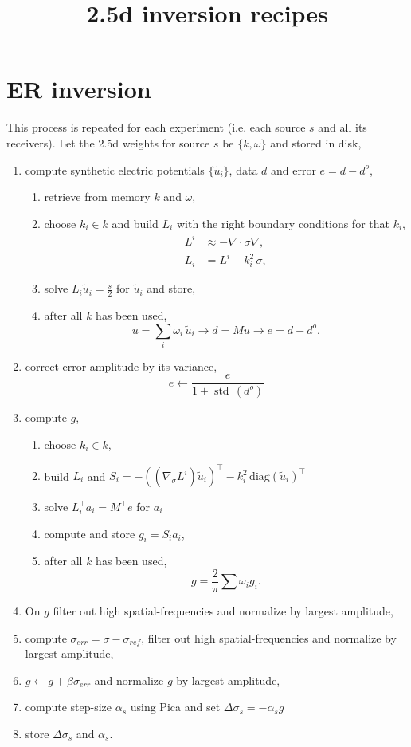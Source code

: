 \documentclass[a4paper,12pt]{article}
\title{2.5d inversion recipes}
\author{}
\date{}
\begin{document}
\maketitle
%
%
% 
\section*{ER inversion}
This process is repeated for each experiment (i.e. each source $s$ and all its receivers). Let the 2.5d weights for source $s$ be $\{k,\omega\}$ and stored in disk,
\begin{enumerate}
\item compute synthetic electric potentials $\{\tilde{u}_i\}$, data $d$ and error $e=d-d^o$,
\begin{enumerate}
\item retrieve from memory $k$ and $\omega$,
\item choose $k_i\in k$ and build $L_i$ with the right boundary conditions for that $k_i$,
\begin{align*}
L^{i} &\approx -\nabla\cdot\sigma\nabla,\\
L_{i} &= L^{i} + k_i^2\,\sigma,
\end{align*}
\item solve $L_{i}\tilde{u}_{i}=\frac{s}{2}$ for $\tilde{u}_{i}$ and store,
\item after all $k$ has been used,
\[ 
u=\sum_i \omega_i \,\tilde{u}_{i} \to d=Mu \to e=d-d^o.
\]
\end{enumerate}
\item correct error amplitude by its variance,
\[
e\gets \frac{e}{1+\operatorname{std}\,(d^o)}
\]
\item compute $g$,
\begin{enumerate}
\item choose $k_i\in k$,
\item build $L_i$ and $S_i=-((\nabla_\sigma L^i)\tilde{u}_i)^\top - k_i^2 \, \mbox{diag}(\tilde{u}_i)^\top$
\item solve $L_i^\top a_i=M^\top e$ for $a_i$
\item compute and store $g_i=S_i a_i$,
\item after all $k$ has been used,
\[ 
g=\frac{2}{\pi}\sum \omega_i g_i.
\]
\end{enumerate}
\item On $g$ filter out high spatial-frequencies and normalize by largest amplitude,
\item compute $\sigma_{err}=\sigma-\sigma_{ref}$, filter out high spatial-frequencies and normalize by largest amplitude,
\item $g\gets g+\beta\sigma_{err}$ and normalize $g$ by largest amplitude,
\item compute step-size $\alpha_s$ using Pica and set $\Delta\sigma_s=-\alpha_s g$
\item store $\Delta\sigma_s$ and $\alpha_s$.
\end{enumerate}
\end{document}
